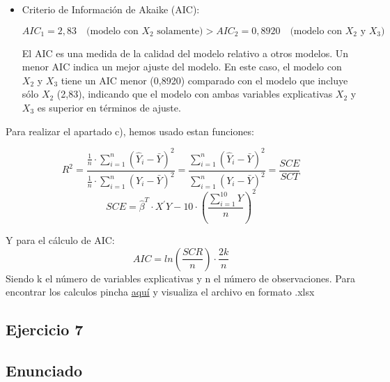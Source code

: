 \documentclass[a4paper,12pt]{article}
\begin{document}
\begin{itemize}
\begin{itemize}
    \item Criterio de Información de Akaike (AIC):
    

\[
    AIC_1 = 2,83 \quad \text{(modelo con \(X_2\) solamente)} > AIC_2 = 0,8920 \quad \text{(modelo con \(X_2\) y \(X_3\))}
    \]


    El AIC es una medida de la calidad del modelo relativo a otros modelos. Un menor AIC indica un mejor ajuste del modelo. En este caso, el modelo con \(X_2\) y \(X_3\) tiene un AIC menor (0,8920) comparado con el modelo que incluye sólo \(X_2\) (2,83), indicando que el modelo con ambas variables explicativas \(X_2\) y \(X_3\) es superior en términos de ajuste.
  \end{itemize}
\end{itemize}

Para realizar el apartado c), hemos usado estan funciones:

     \begin{equation}
        R^2 = \frac{\frac{1}{n} \cdot \sum_{i=1}^{n} \left( \hat{Y}_i - \bar{Y} \right)^2}{\frac{1}{n} \cdot \sum_{i=1}^{n} \left( Y_i - \bar{Y} \right)^2} = \frac{\sum_{i=1}^{n} \left( \hat{Y}_i - \bar{Y} \right)^2}{\sum_{i=1}^{n} \left( Y_i - \bar{Y} \right)^2} = \frac{SCE}{SCT}
        \end{equation}
     \begin{equation}
        SCE = \hat{\beta}^{T} \cdot X^{\prime}Y - 10 \cdot \left(\frac{\sum_{i=1}^{10}Y}{n}\right)^{2}    
    \end{equation}

    
    
Y para el cálculo de AIC:
\begin{equation}
    AIC = ln (\frac{SCR}{n}) \cdot \frac{2k}{n}
\end{equation}
Siendo k el número de variables explicativas y n el número de observaciones.
Para encontrar los calculos pincha \href{https://github.com/ElblogdeIsmael/ElblogdeIsmael.github.io/tree/main/Subjects/Third/ECO/Practicas/EjerciciosPropuestos/SolucionesEjercicios/Tema2}{aquí} y visualiza el archivo en formato .xlsx

\subsection{Ejercicio 7}
\subsection*{Enunciado}
\end{document}

